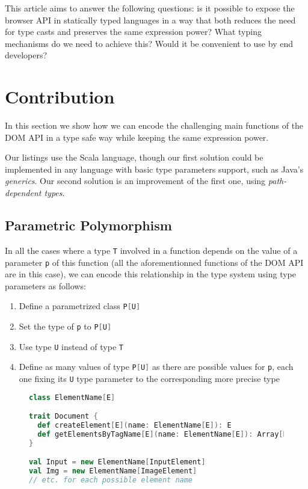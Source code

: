 \documentclass{llncs}
\newcommand{\jscode}[1]{\lstinline[language=JavaScript]|#1|}
\newcommand{\scalacode}[1]{\lstinline[language=Scala]|#1|}
\begin{document}
This article aims to answer the following questions: is it possible to expose the browser API in statically typed languages in a way that both reduces the need for type casts and preserves the same expression power? What typing mechanisms do we need to achieve this? Would it be convenient to use by end developers?

\section{Contribution}
\label{sec-contribution}

In this section we show how we can encode the challenging main functions of the DOM API in a type safe way while keeping the same expression power.

Our listings use the Scala language, though our first solution could be implemented in any language with basic type parameters support, such as Java's \emph{generics}. Our second solution is an improvement of the first one, using \emph{path-dependent types}.

\subsection{Parametric Polymorphism}

In all the cases where a type \scalacode{T} involved in a function depends on the value of a parameter \scalacode{p} of this function (all the aforementionned functions of the DOM API are in this case), we can encode this relationship in the type system using type parameters as follows:

\begin{enumerate}
 \item Define a parametrized class \scalacode{P[U]}
 \item Set the type of \scalacode{p} to \scalacode{P[U]}
 \item Use type \scalacode{U} instead of type \scalacode{T}
 \item Define as many values of type \scalacode{P[U]} as there are possible values for \scalacode{p}, each one fixing its \scalacode{U} type parameter to the corresponding more precise type
\end{enumerate}

\begin{figure}
\begin{lstlisting}[label=lst-generics-dom,language=Scala,caption={Encoding of the \jscode{createElement} function using type parameters}]
class ElementName[E]

trait Document {
  def createElement[E](name: ElementName[E]): E
  def getElementsByTagName[E](name: ElementName[E]): Array[E]
}

val Input = new ElementName[InputElement]
val Img = new ElementName[ImageElement]
// etc. for each possible element name
\end{lstlisting}
\end{figure}
\end{document}
